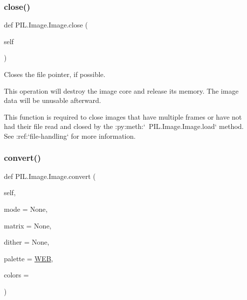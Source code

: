 \subsubsection{\texorpdfstring{close()}{close()}}
{\footnotesize\ttfamily def P\+I\+L.\+Image.\+Image.\+close (\begin{DoxyParamCaption}\item[{}]{self }\end{DoxyParamCaption})}

\begin{DoxyVerb}Closes the file pointer, if possible.

This operation will destroy the image core and release its memory.
The image data will be unusable afterward.

This function is required to close images that have multiple frames or
have not had their file read and closed by the
:py:meth:`~PIL.Image.Image.load` method. See :ref:`file-handling` for
more information.
\end{DoxyVerb}
 \mbox{\label{classPIL_1_1Image_1_1Image_a0094514054e421937b31e9039703aaff}} 
\subsubsection{\texorpdfstring{convert()}{convert()}}
{\footnotesize\ttfamily def P\+I\+L.\+Image.\+Image.\+convert (\begin{DoxyParamCaption}\item[{}]{self,  }\item[{}]{mode = {\ttfamily None},  }\item[{}]{matrix = {\ttfamily None},  }\item[{}]{dither = {\ttfamily None},  }\item[{}]{palette = {\ttfamily \hyperlink{namespacePIL_1_1Image_ac8a45c0e04c437394a776b8ade4c0912}{W\+EB}},  }\item[{}]{colors = {} }\end{DoxyParamCaption})}

